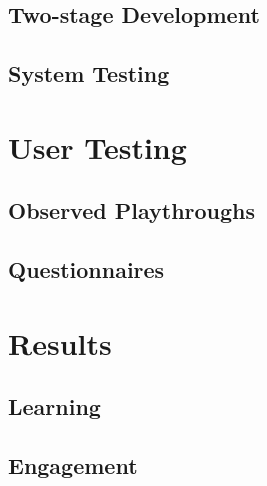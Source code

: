 \documentclass[a4paper,11.5pt]{report}
\numberwithin{figure}{section}
\numberwithin{table}{section}
\numberwithin{equation}{section}
\numberwithin{equation}{section}
\newcommand\blankpage{%
    \null
    \thispagestyle{empty}%
    \addtocounter{page}{-1}%
    \newpage}
\begin{document}







\section{Two-stage Development}

\section{System Testing}


\afterpage{\blankpage}




\chapter{User Testing}

\section{Observed Playthroughs} %
\section{Questionnaires}



\afterpage{\blankpage}




\chapter{Results}

\section{Learning}

\section{Engagement}
\end{document}
